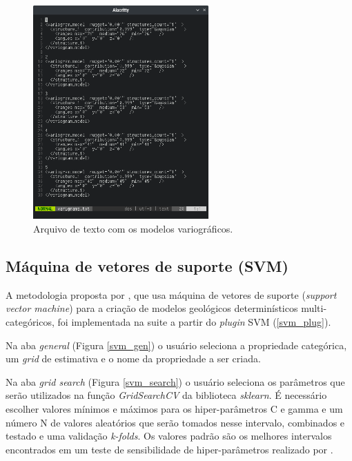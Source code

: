 \begin{figure}[H]
	\caption{\label{vario_model_txt}Arquivo de texto com os modelos variográficos.}
	\centering
		\includegraphics[width=0.6\textwidth]{apendice/imagens/variograms.png}
\end{figure}

\subsection{Máquina de vetores de suporte (SVM)}

A metodologia proposta por , que usa máquina de vetores de suporte (\textit{support vector machine}) para a criação de modelos geológicos determinísticos multi-categóricos, foi implementada na suite a partir do \textit{plugin} SVM (\autoref{svm_plug}).

Na aba \textit{general} (Figura \autoref{svm_gen}) o usuário seleciona a propriedade categórica, um \textit{grid} de estimativa e o nome da propriedade a ser criada.

Na aba \textit{grid search} (Figura \autoref{svm_search}) o usuário seleciona os parâmetros que serão utilizados na função \textit{GridSearchCV} da biblioteca \textit{sklearn}. É necessário escolher valores mínimos e máximos para os hiper-parâmetros C e gamma e um número N de valores aleatórios que serão tomados nesse intervalo, combinados e testado e uma validação \textit{k-folds}. Os valores padrão são os melhores intervalos encontrados em um teste de sensibilidade de hiper-parâmetros realizado por .

